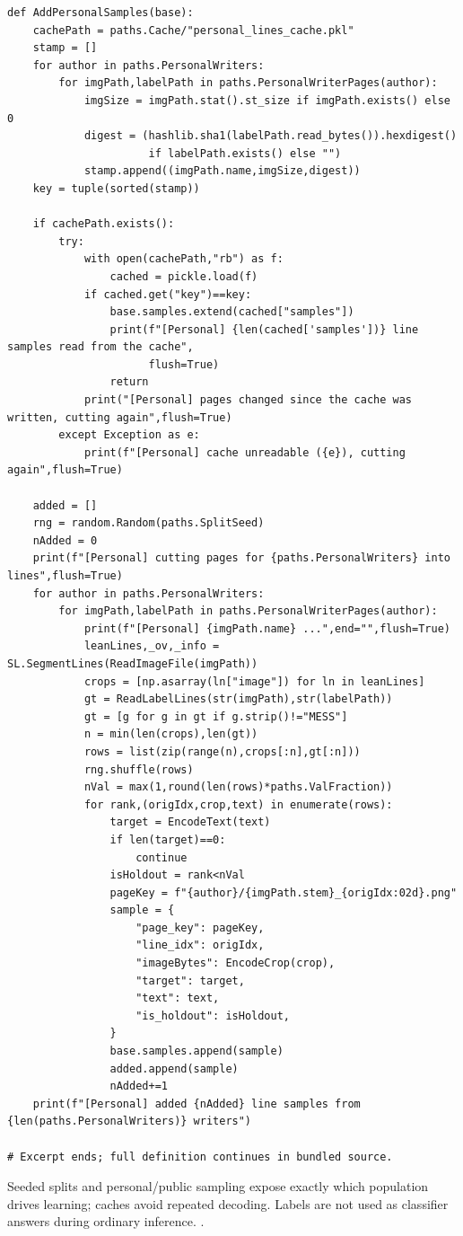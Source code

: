 \begin{lstlisting}[style=plain]
def AddPersonalSamples(base):
    cachePath = paths.Cache/"personal_lines_cache.pkl"
    stamp = []
    for author in paths.PersonalWriters:
        for imgPath,labelPath in paths.PersonalWriterPages(author):
            imgSize = imgPath.stat().st_size if imgPath.exists() else 0
            digest = (hashlib.sha1(labelPath.read_bytes()).hexdigest()
                      if labelPath.exists() else "")
            stamp.append((imgPath.name,imgSize,digest))
    key = tuple(sorted(stamp))

    if cachePath.exists():
        try:
            with open(cachePath,"rb") as f:
                cached = pickle.load(f)
            if cached.get("key")==key:
                base.samples.extend(cached["samples"])
                print(f"[Personal] {len(cached['samples'])} line samples read from the cache",
                      flush=True)
                return
            print("[Personal] pages changed since the cache was written, cutting again",flush=True)
        except Exception as e:
            print(f"[Personal] cache unreadable ({e}), cutting again",flush=True)

    added = []
    rng = random.Random(paths.SplitSeed)
    nAdded = 0
    print(f"[Personal] cutting pages for {paths.PersonalWriters} into lines",flush=True)
    for author in paths.PersonalWriters:
        for imgPath,labelPath in paths.PersonalWriterPages(author):
            print(f"[Personal] {imgPath.name} ...",end="",flush=True)
            leanLines,_ov,_info = SL.SegmentLines(ReadImageFile(imgPath))
            crops = [np.asarray(ln["image"]) for ln in leanLines]
            gt = ReadLabelLines(str(imgPath),str(labelPath))
            gt = [g for g in gt if g.strip()!="MESS"]
            n = min(len(crops),len(gt))
            rows = list(zip(range(n),crops[:n],gt[:n]))
            rng.shuffle(rows)
            nVal = max(1,round(len(rows)*paths.ValFraction))
            for rank,(origIdx,crop,text) in enumerate(rows):
                target = EncodeText(text)
                if len(target)==0:
                    continue
                isHoldout = rank<nVal
                pageKey = f"{author}/{imgPath.stem}_{origIdx:02d}.png"
                sample = {
                    "page_key": pageKey,
                    "line_idx": origIdx,
                    "imageBytes": EncodeCrop(crop),
                    "target": target,
                    "text": text,
                    "is_holdout": isHoldout,
                }
                base.samples.append(sample)
                added.append(sample)
                nAdded+=1
    print(f"[Personal] added {nAdded} line samples from {len(paths.PersonalWriters)} writers")

# Excerpt ends; full definition continues in bundled source.
\end{lstlisting}
Seeded splits and personal/public sampling expose exactly which population drives learning; caches avoid repeated decoding. Labels are not used as classifier answers during ordinary inference. \cite{marti2002,code2026,torchdata}.



